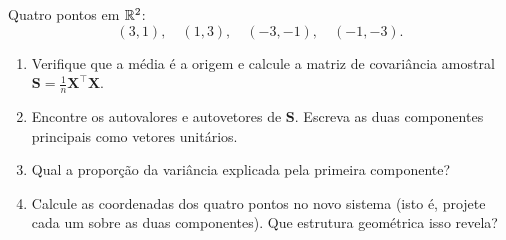 \documentclass[11pt,a4paper]{article}
\begin{document}

\begin{exercicio}
Quatro pontos em $\mathbb{R}^2$:
\[
  (3,1), \quad (1,3), \quad (-3,-1), \quad (-1,-3).
\]
\begin{enumerate}[label=(\alph*),leftmargin=1.1cm]
  \item Verifique que a média é a origem e calcule a matriz de covariância
        amostral $\bm S = \tfrac1n\bm X^\top\bm X$.
  \item Encontre os autovalores e autovetores de $\bm S$. Escreva as duas
        componentes principais como vetores unitários.
  \item Qual a proporção da variância explicada pela primeira componente?
  \item Calcule as coordenadas dos quatro pontos no novo sistema (isto é,
        projete cada um sobre as duas componentes). Que estrutura geométrica isso
        revela?
\end{enumerate}
\end{exercicio}
\end{document}

